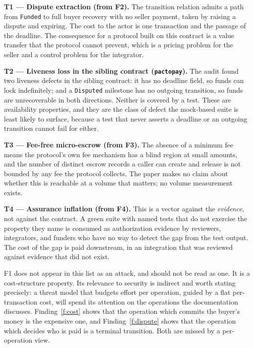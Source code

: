 \documentclass[sigconf,review]{acmart}
\begin{document}
\textbf{T1 --- Dispute extraction (from F2).} The transition relation admits a
path from \texttt{Funded} to full buyer recovery with no seller payment, taken
by raising a dispute and expiring. The cost to the actor is one transaction
and the passage of the deadline. The consequence for a protocol built on this
contract is a value transfer that the protocol cannot prevent, which is a
pricing problem for the seller and a control problem for the integrator.

\textbf{T2 --- Liveness loss in the sibling contract
(\texttt{pactopay}).} The audit found two liveness defects in the sibling
contract: it has no deadline field, so funds can lock indefinitely; and a
\texttt{Disputed} milestone has no outgoing transition, so funds are
unrecoverable in both directions. Neither is covered by a test. These are
availability properties, and they are the class of defect the mock-based suite
is least likely to surface, because a test that never asserts a deadline or an
outgoing transition cannot fail for either.


\textbf{T3 --- Fee-free micro-escrow (from F3).} The absence of a minimum fee
means the protocol's own fee mechanism has a blind region at small amounts, and
the number of distinct escrow records a caller can create and release is not
bounded by any fee the protocol collects. The paper makes no claim about
whether this is reachable at a volume that matters; no volume measurement
exists.

\textbf{T4 --- Assurance inflation (from F4).} This is a vector against the
\emph{evidence}, not against the contract. A green suite with named tests that
do not exercise the property they name is consumed as authorization evidence by
reviewers, integrators, and funders who have no way to detect the gap from the
test output. The cost of the gap is paid downstream, in an integration that was
reviewed against evidence that did not exist.

F1 does not appear in this list as an attack, and should not be read as one. It
is a cost-structure property. Its relevance to security is indirect and worth
stating precisely: a threat model that budgets effort per operation, guided by a
flat per-transaction cost, will spend its attention on the operations the
documentation discusses. Finding~\ref{f:cost} shows that the operation which
commits the buyer's money is the expensive one, and Finding~\ref{f:dispute}
shows that the operation which decides who is paid is a terminal transition.
Both are missed by a per-operation view.
\end{document}
